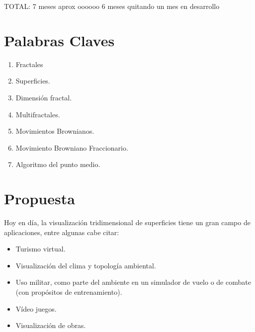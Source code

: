 \documentclass[12pt]{article} %
\begin{document}
TOTAL: 7 meses aprox oooooo 6 meses quitando un mes en desarrollo









\section{Palabras Claves} %

\begin{enumerate}
\item Fractales
\item Superficies.
\item Dimensión fractal.
\item Multifractales.
\item Movimientos Brownianos.
\item Movimiento Browniano Fraccionario.
\item Algoritmo del punto medio.
\end{enumerate}



\section{Propuesta} %
Hoy en día, la visualización tridimensional de superficies tiene un gran campo de aplicaciones, entre algunas cabe citar:

\begin{itemize}
\item Turismo virtual.
\item Visualización del clima y topología ambiental.
\item Uso militar, como parte del ambiente en un simulador de vuelo o de combate (con propósitos de entrenamiento).
\item Vídeo juegos.
\item Visualización de obras.
\end{itemize}
\end{document}
